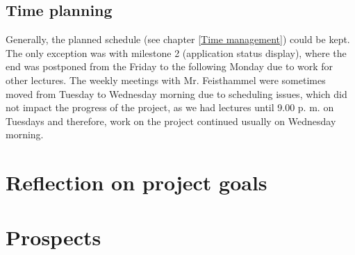 \subsection{Time planning}
Generally, the planned schedule (see chapter \ref{Time management}) could be kept. The only exception was with milestone 2 (application status display), where the end was postponed from the Friday to the following Monday due to work for other lectures. The weekly meetings with Mr. Feisthammel were sometimes moved from Tuesday to Wednesday morning due to scheduling issues, which did not impact the progress of the project, as we had lectures until 9.00 p. m. on Tuesdays and therefore, work on the project continued usually on Wednesday morning.

\section{Reflection on project goals}


\section{Prospects}